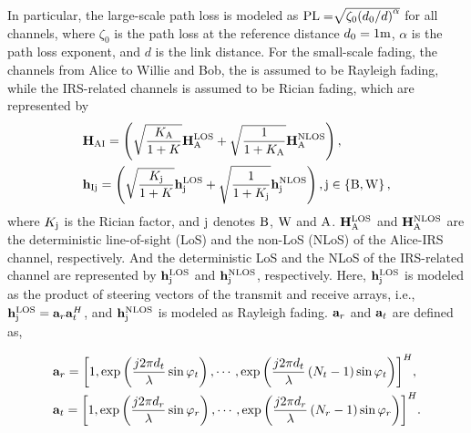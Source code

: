 \documentclass[10pt,journal,letterpaper,twocolumn,twoside]{IEEEtran} %
\begin{document}
In particular, the large-scale path loss is modeled as
${\rm{PL = }}\sqrt {{\zeta _0}{{\left( {{d_0}/d} \right)}^\alpha }} $ for all channels, where ${\zeta _0}$ is the path loss at the reference distance ${d_0} = 1{\rm{m}}$, $\alpha$ is the path loss exponent, and $d$ is the link distance.
For the small-scale fading, the channels from Alice  to  Willie and Bob, the is assumed to be Rayleigh fading, while the IRS-related
channels  is assumed to be Rician fading,
which are represented by
\begin{subequations}
\begin{align}
&{{\bf{H}}_{{\rm{AI}}}} = \left( {\sqrt {\frac{K_{{\rm{A}}}}{{1 + K}}} {\bf{H}}_{{\rm{A}}}^{{\rm{LOS}}} + \sqrt {\frac{1}{{1 + {K_{{\rm{A}}}}}}} {\bf{H}}_{{\rm{A}}}^{{\rm{NLOS}}}} \right),\\
&{{\bf{h}}_{{\rm{Ij}}}} = \left( {\sqrt {\frac{K_{{\rm{j}}}}{{1 + K}}} {\bf{h}}_{{\rm{j}}}^{{\rm{LOS}}} + \sqrt {\frac{1}{{1 + {K_{{\rm{j}}}}}}} {\bf{h}}_{{\rm{j}}}^{{\rm{NLOS}}}} \right),{\rm{j}} \in \left\{ {{\rm{B}},{\rm{W}}} \right\},
\end{align}
\end{subequations}
where ${K_{{\rm{j}}}}$ is the Rician factor, and ${\rm{j}}$ denotes ${\rm{B}}$, ${\rm{W}}$ and ${\rm{A}}$. ${\bf{H}}_{{\rm{A}}}^{{\rm{LOS}}}$ and ${\bf{H}}_{{\rm{A}}}^{{\rm{NLOS}}}$ are the deterministic  line-of-sight (LoS) and  the non-LoS (NLoS) of the Alice-IRS channel,  respectively. And the deterministic  LoS and  the NLoS of the IRS-related channel are represented by ${\bf{h}}_{{\rm{j}}}^{{\rm{LOS}}}$ and ${\bf{h}}_{{\rm{j}}}^{{\rm{NLOS}}}$,  respectively. Here, ${\bf{h}}_{{\rm{j}}}^{{\rm{LOS}}}$ is modeled as the product of steering vectors of the transmit and receive arrays, i.e., ${\bf{h}}_{{\rm{j}}}^{{\rm{LOS}}} = {{\bf{a}}_r}{\bf{a}}_t^H$, and  ${\bf{h}}_{{\rm{j}}}^{{\rm{NLOS}}}$  is modeled as Rayleigh fading. ${{\bf{a}}_r}$ and ${{\bf{a}}_t}$ are defined as,
\begin{small}
\begin{subequations}
\begin{align}
&{{\bf{a}}_r} = {\left[ {1,\exp \left( { \frac{{j2\pi{d_t}}}{\lambda }\sin {\varphi _t}} \right), \cdots ,\exp \left( { \frac{{j2\pi{d_t}}}{\lambda }\left( {{N_t} - 1} \right)\sin {\varphi _t}} \right)} \right]^H},\\
&{{\bf{a}}_t} = {\left[ {1,\exp \left( { \frac{{j2\pi{d_r}}}{\lambda }\sin {\varphi _r}} \right), \cdots ,\exp \left( { \frac{{j2\pi{d_r}}}{\lambda }\left( {{N_r} - 1} \right)\sin {\varphi _r}} \right)} \right]^H}.
\end{align}
\end{subequations}
\end{small}
\end{document}
